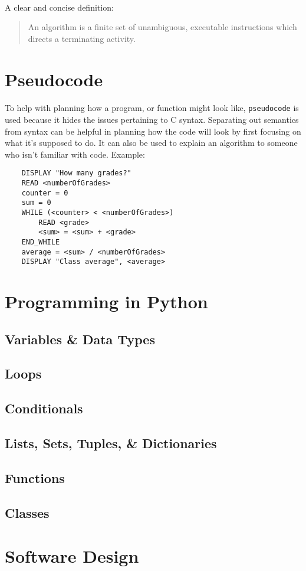 \documentclass[letter,10pt]{article}
\begin{document}
\paragraph{}A clear and concise definition:
\begin{quote}
An algorithm is a finite set of unambiguous, executable instructions which directs a terminating activity.
\end{quote}

\section{Pseudocode}
\paragraph{}To help with planning how a program, or function might look like, \texttt{pseudocode} is used because it hides the issues pertaining to C syntax. Separating out semantics from syntax can be helpful in planning how the code will look by first focusing on what it's supposed to do. It can also be used to explain an algorithm to someone who isn't familiar with code. Example:

\begin{verbatim}
    DISPLAY "How many grades?"
    READ <numberOfGrades>
    counter = 0
    sum = 0
    WHILE (<counter> < <numberOfGrades>)
        READ <grade>
        <sum> = <sum> + <grade>
    END_WHILE
    average = <sum> / <numberOfGrades>
    DISPLAY "Class average", <average>
\end{verbatim}

\section{Programming in Python}

\subsection{Variables \& Data Types}

\subsection{Loops}

\subsection{Conditionals}

\subsection{Lists, Sets, Tuples, \& Dictionaries}

\subsection{Functions}

\subsection{Classes}

\section{Software Design}
\end{document}
